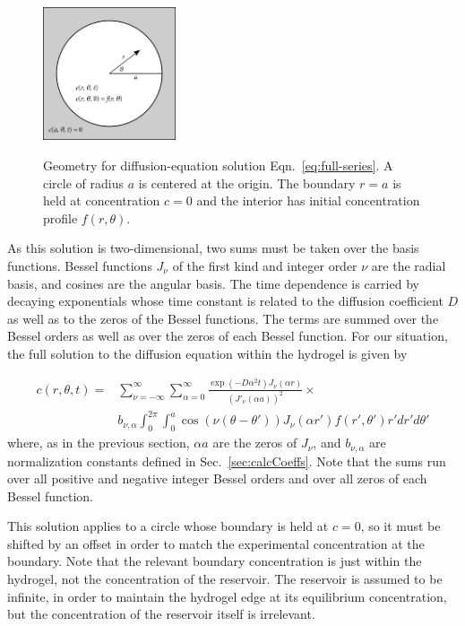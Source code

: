 \begin{figure}
\caption[Geometry for Fourier transform solution.]{Geometry for diffusion-equation solution Eqn.~\ref{eq:full-series}.  A circle of radius $a$ is centered at the origin.  The boundary $r=a$ is held at concentration $c=0$ and the interior has initial concentration profile $f(r,\theta)$.}
\centering
\includegraphics[width=0.35\textwidth]{figs/ch04/carslaw-geometry}
\label{fig:carslaw-geo}
\end{figure} 

As this solution is two-dimensional, two sums must be taken over the basis functions.  Bessel functions $J_\nu$ of the first kind and integer order $\nu$ are the radial basis, and cosines are the angular basis.  The time dependence is carried by decaying exponentials whose time constant is related to the diffusion coefficient $D$ as well as to the zeros of the Bessel functions.  The terms are summed over the Bessel orders as well as over the zeros of each Bessel function.  For our situation, the full solution to the diffusion equation within the hydrogel is given by \cite{h.s.carslaw59}

\begin{equation}
\begin{split}
c(r,\theta,t) =& \sum_{\nu=-\infty}^{\infty} \sum_{\alpha = 0}^\infty   \frac{\exp\left(-D\alpha^2t\right)J_\nu\left(\alpha r\right)}{\left(J'_\nu(\alpha a)\right)^2} \times \\ 
&b_{\nu,\alpha} \int_0^{2\pi} \int_0^a \cos\left(\nu(\theta-\theta')\right) J_\nu(\alpha r') f(r',\theta') r' dr' d\theta' \label{eq:full-series}
\end{split}
\end{equation}
where, as in the previous section, $\alpha a$ are the zeros of $J_\nu$, and $b_{\nu,\alpha}$ are normalization constants defined in Sec.~\ref{sec:calcCoeffs}.  Note that the sums run over all positive and negative integer Bessel orders and over all zeros of each Bessel function.  

This solution applies to a circle whose boundary is held at $c=0$, so it must be shifted by an offset in order to match the experimental concentration at the boundary.  Note that the relevant boundary concentration is just within the hydrogel, not the concentration of the reservoir.  The reservoir is assumed to be infinite, in order to maintain the hydrogel edge at its equilibrium concentration, but the concentration of the reservoir itself is irrelevant.


